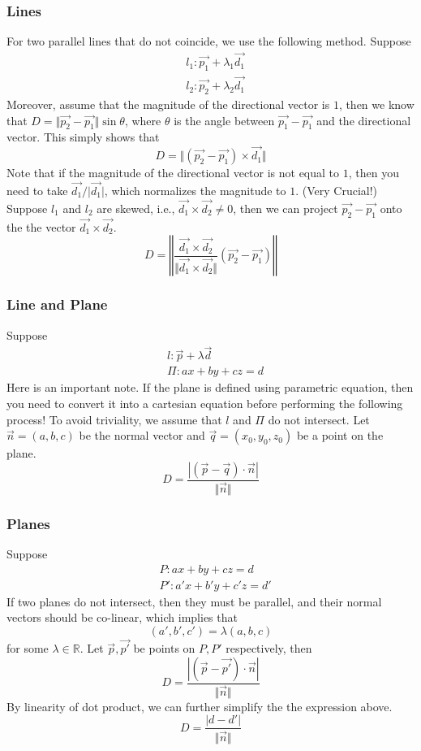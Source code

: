 \documentclass{article}
\theoremstyle{definition}
\theoremstyle{definition}
\theoremstyle{definition}
\theoremstyle{definition}
\theoremstyle{definition}
\theoremstyle{definition}
\theoremstyle{definition}
\theoremstyle{definition}
\theoremstyle{definition}
\newcommand{\RR}{\mathbb{R}}
\begin{document}
\subsubsection{Lines}
For two parallel lines that do not coincide, we use the following method. Suppose 
\begin{align*}
    &l_1:\vec{p_1}+\lambda_1\vec{d_1}\\
    &l_2:\vec{p_2}+\lambda_2\vec{d_1}
\end{align*}
Moreover, assume that the magnitude of the directional vector is $1$, then we know that
$D=\Vert\vec{p_2}-\vec{p_1}\Vert\sin\theta$, where $\theta$ is the angle between $\vec{p_1}-\vec{p_1}$ and the directional vector.
This simply shows that
\[D=\Vert(\vec{p_2}-\vec{p_1})\times \vec{d_1}\Vert\]
Note that if the magnitude of the directional vector is not equal to $1$, then you need to take $\vec{d_1}/\vert\vec{d_1}\vert$, which normalizes the magnitude to $1$. (Very Crucial!)
Suppose $l_1$ and $l_2$ are skewed, i.e., $\vec{d_1}\times\vec{d_2}\neq 0$, then
we can project $\vec{p_2}-\vec{p_1}$ onto the the vector $\vec{d_1}\times\vec{d_2}$.
\[
D=\left\Vert\dfrac{\vec{d_1}\times \vec{d_2}}{\Vert\vec{d_1}\times\vec{d_2}\Vert}(\vec{p_2}-\vec{p_1})\right\Vert    
\]
\subsubsection{Line and Plane}
Suppose 
\begin{align*}
    &l:\vec{p}+\lambda\vec{d}\\
    &\Pi:ax+by+cz=d
\end{align*}
Here is an important note. If the plane is defined using parametric equation, then you need to convert it into a cartesian equation before performing the following process!
To avoid triviality, we assume that $l$ and $\Pi$ do not intersect. Let $\vec{n}=(a,b,c)$ be the normal vector and $\vec{q}=(x_0,y_0,z_0)$ be a point on the plane.
\[
D=\dfrac{|(\vec{p}-\vec{q})\cdot\vec{n}|}{\Vert\vec{n}\Vert}
\] 
\subsubsection{Planes}
Suppose 
\begin{align*}
    &P:ax+by+cz=d\\
    &P':a'x+b'y+c'z=d'
\end{align*}
If two planes do not intersect, then they must be parallel, and their normal vectors should be co-linear, which implies that
\[(a',b',c')=\lambda(a,b,c)\]
for some $\lambda\in\RR$.
Let $\vec{p},\vec{p'}$ be points on $P,P'$ respectively, then
\[
D=\dfrac{|(\vec{p}-\vec{p'})\cdot\vec{n}|}{\Vert \vec{n}\Vert}   
\]
By linearity of dot product, we can further simplify the the expression above.
\[D=\dfrac{|d-d'|}{\Vert\vec{n}\Vert}\]
\end{document}
